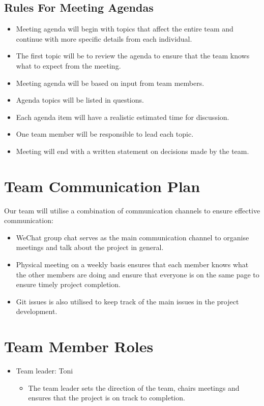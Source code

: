 \documentclass{article}
\begin{document}
\subsection{Rules For Meeting Agendas}
\begin{itemize}
    \item Meeting agenda will begin with topics that affect the entire team and continue with more specific details from each individual.
    \item The first topic will be to review the agenda to ensure that the team knows what to expect from the meeting.
    \item Meeting agenda will be based on input from team members.
    \item Agenda topics will be listed in questions.
    \item Each agenda item will have a realistic estimated time for discussion.
    \item One team member will be responsible to lead each topic.
    \item Meeting will end with a written statement on decisions made by the team.
\end{itemize}

\section{Team Communication Plan}
Our team will utilise a combination of communication channels to ensure effective communication:
\begin{itemize}
    \item WeChat group chat serves as the main communication channel to organise meetings and talk about the project in general.
    \item Physical meeting on a weekly basis ensures that each member knows what the other members are doing and ensure that everyone is on the same page to ensure timely project completion.
    \item Git issues is also utilised to keep track of the main issues in the project development.
\end{itemize}

\section{Team Member Roles}
\begin{itemize}
    \item Team leader: Toni
    \begin{itemize}
        \item The team leader sets the direction of the team, chairs meetings and ensures that the project is on track to completion.
    \end{itemize}
\end{itemize}
\end{document}
